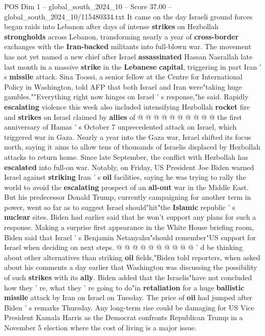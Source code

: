 \begin{textsample}{POS Dim 1 – global\_south\_2024\_10 – Score 37.00 – global\_south\_2024\_10/115480334.txt}
It came on the day Israeli ground forces began raids into Lebanon after days of intense \textbf{strikes} on Hezbollah \textbf{strongholds} across Lebanon, transforming nearly a year of \textbf{cross-border} exchanges with the \textbf{Iran-backed} militants into full-blown war.
The movement has not yet named a new chief after Israel \textbf{assassinated} Hassan Nasrallah late last month in a massive \textbf{strike} in the \textbf{Lebanese} \textbf{capital}, triggering in part Iran ' s \textbf{missile} attack.
Sina Toossi, a senior fellow at the Centre for International Policy in Washington, told AFP that both Israel and Iran were"taking huge gambles.""Everything right now hinges on Israel ' s response,"he said.
Rapidly \textbf{escalating} violence this week also included intensifying Hezbollah \textbf{rocket} fire and \textbf{strikes} on Israel claimed by \textbf{allies} of @ @ @ @ @ @ @ @ @ @ the first anniversary of Hamas ' s October 7 unprecedented attack on Israel, which triggered war in Gaza.
Nearly a year into the Gaza war, Israel shifted its focus north, saying it aims to allow tens of thousands of Israelis displaced by Hezbollah attacks to return home.
Since late September, the conflict with Hezbollah has \textbf{escalated} into full-on war.
Notably, on Friday, US President Joe Biden warned Israel against \textbf{striking} Iran ' s \textbf{oil} facilities, saying he was trying to rally the world to avoid the \textbf{escalating} prospect of an \textbf{all-out} war in the Middle East.
But his predecessor Donald Trump, currently campaigning for another term in power, went so far as to suggest Israel should"hit"the \textbf{Islamic} republic ' s \textbf{nuclear} sites.
Biden had earlier said that he won't support any plans for such a response.
Making a surprise first appearance in the White House briefing room, Biden said that Israel ' s Benjamin Netanyahu"should remember"US support for Israel when deciding on next steps. @ @ @ @ @ @ @ @ @ @ ' d be thinking about other alternatives than striking \textbf{oil} fields,"Biden told reporters, when asked about his comments a day earlier that Washington was discussing the possibility of such \textbf{strikes} with its \textbf{ally}.
Biden added that the Israelis"have not concluded how they ' re, what they ' re going to do"in \textbf{retaliation} for a huge \textbf{ballistic} \textbf{missile} attack by Iran on Israel on Tuesday.
The price of \textbf{oil} had jumped after Biden ' s remarks Thursday.
Any long-term rise could be damaging for US Vice President Kamala Harris as the Democrat confronts Republican Trump in a November 5 election where the cost of living is a major issue.

\end{textsample}
